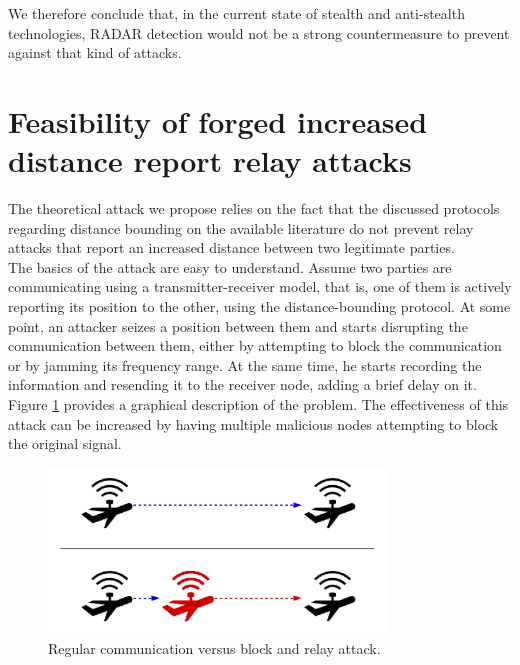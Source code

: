 \documentclass{article}
\begin{document}
We therefore conclude that, in the current state of stealth and anti-stealth technologies, RADAR detection would not be a strong countermeasure to prevent against that kind of attacks.\\







































\section{Feasibility of forged increased distance report relay attacks}
\label{sec:attackfeasibility}

The theoretical attack we propose relies on the fact that the discussed protocols regarding distance bounding on the available literature do not prevent relay attacks that report an increased distance between two legitimate parties.\\

The basics of the attack are easy to understand. Assume two parties are communicating using a transmitter-receiver model, that is, one of them is actively reporting its position to the other, using the distance-bounding protocol. At some point, an attacker seizes a position between them and starts disrupting the communication between them, either by attempting to block the communication or by jamming its frequency range. At the same time, he starts recording the information and resending it to the receiver node, adding a brief delay on it. Figure \ref{fig:attackexample1} provides a graphical description of the problem. The effectiveness of this attack can be increased by having multiple malicious nodes attempting to block the original signal.\\

\begin{figure}[h!]
  \centering
    \includegraphics[width=0.8\textwidth]{images/attack1.png}
  \caption{Regular communication versus block and relay attack.}
  \label{fig:attackexample1}
\end{figure}
\end{document}
